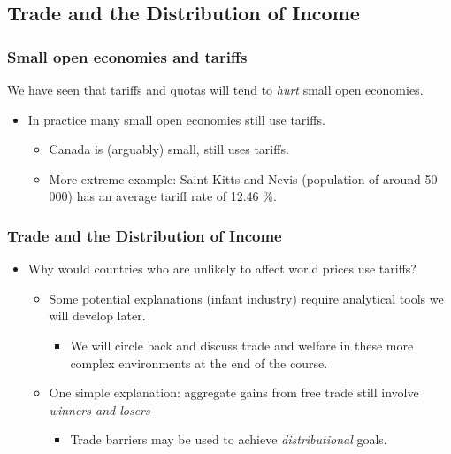 \documentclass{beamer}
\begin{document}
\subsection{Trade and the Distribution of Income}
\begin{frame}
		\frametitle{Small open economies and tariffs}

We have seen that tariffs and quotas will tend to \emph{hurt} small open economies.
		\begin{itemize}
			\item In practice many small open economies still use tariffs.	
				\begin{itemize}
					\item Canada is (arguably) small, still uses tariffs.
					\item More extreme example: Saint Kitts and Nevis (population of around 50 000) has an average tariff rate of 12.46 \%.
				\end{itemize}
		\end{itemize}


	
\end{frame}


\begin{frame}
	\frametitle{Trade and the Distribution of Income}
	\begin{itemize}
	\item Why would countries who are unlikely to affect world prices use tariffs?
	\begin{itemize}
		\item Some potential explanations (infant industry) require analytical tools we will develop later.
		\begin{itemize}
			\item We will circle back and discuss trade and welfare in these more complex environments at the end of the course.
		\end{itemize}
		\item One simple explanation: aggregate gains from free trade still involve \emph{winners and losers}
		\begin{itemize}
			\item Trade barriers may be used to achieve \emph{distributional} goals.
		\end{itemize}
	\end{itemize}
	\end{itemize}
	
	
\end{frame}
\end{document}
